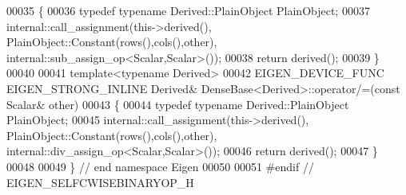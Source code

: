 \begin{DoxyCode}
00035 \{
00036   \textcolor{keyword}{typedef} \textcolor{keyword}{typename} Derived::PlainObject PlainObject;
00037   internal::call\_assignment(this->derived(), PlainObject::Constant(rows(),cols(),other), 
      internal::sub\_assign\_op<Scalar,Scalar>());
00038   \textcolor{keywordflow}{return} derived();
00039 \}
00040 
00041 \textcolor{keyword}{template}<\textcolor{keyword}{typename} Derived>
00042 EIGEN\_DEVICE\_FUNC EIGEN\_STRONG\_INLINE Derived& DenseBase<Derived>::operator/=(\textcolor{keyword}{const} Scalar& other)
00043 \{
00044   \textcolor{keyword}{typedef} \textcolor{keyword}{typename} Derived::PlainObject PlainObject;
00045   internal::call\_assignment(this->derived(), PlainObject::Constant(rows(),cols(),other), 
      internal::div\_assign\_op<Scalar,Scalar>());
00046   \textcolor{keywordflow}{return} derived();
00047 \}
00048 
00049 \} \textcolor{comment}{// end namespace Eigen}
00050 
00051 \textcolor{preprocessor}{#endif // EIGEN\_SELFCWISEBINARYOP\_H}
\end{DoxyCode}
